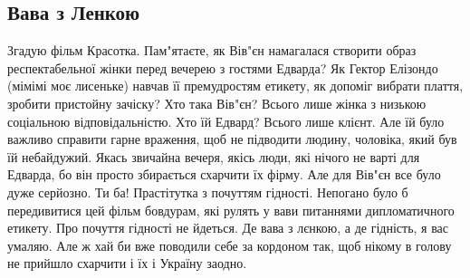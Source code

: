  
 
 
 
 

\subsection{Вава з Ленкою}
\label{sec:06_04_2021.fb.makarenko_oksana.1.vava}

Згадую фільм Красотка. Пам"ятаєте, як Вів"єн намагалася створити образ
респектабельної жінки перед вечерею з гостями Едварда? Як Гектор Елізондо
(мімімі моє лисеньке) навчав її премудростям етикету, як допоміг вибрати
плаття, зробити пристойну зачіску? Хто така Вів"єн? Всього лише жінка з низькою
соціальною відповідальністю. Хто їй Едвард? Всього лише клієнт. Але їй було
важливо справити гарне враження, щоб не підводити людину, чоловіка, який був їй
небайдужий. Якась звичайна вечеря, якісь люди, які нічого не варті для Едварда,
бо він просто збирається схарчити їх фірму. Але для Вів"єн все було дуже
серйозно. Ти ба! Прастітутка з почуттям гідності.  Непогано було б передивитися
цей фільм бовдурам, які рулять у вави питаннями дипломатичного етикету. Про
почуття гідності не йдеться. Де вава з лєнкою, а де гідність, я вас умаляю. Але
ж хай би вже поводили себе за кордоном так, щоб нікому в голову не прийшло
схарчити і їх і Україну заодно.
